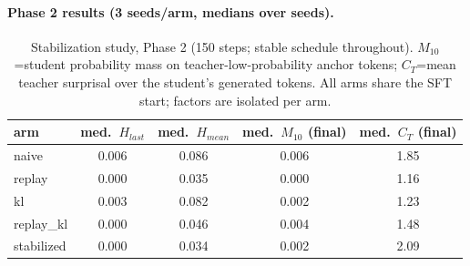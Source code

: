 \documentclass[11pt]{article}
\begin{document}
\paragraph{Phase 2 results (3 seeds/arm, medians over seeds).}
\begin{table}[h]
\centering
\caption{Stabilization study, Phase 2 (150 steps; stable schedule throughout). $M_{10}$=student probability mass on teacher-low-probability anchor tokens; $C_T$=mean teacher surprisal over the student's generated tokens. All arms share the SFT start; factors are isolated per arm.}
\label{tab:stab}
\small
\begin{tabular}{@{}lcccc@{}}
\toprule
\textbf{arm} & med.\ $H_{last}$ & med.\ $H_{mean}$ & med.\ $M_{10}$ (final) & med.\ $C_T$ (final) \\
\midrule
naive      & 0.006 & 0.086 & 0.006 & 1.85 \\
replay     & 0.000 & 0.035 & 0.000 & 1.16 \\
kl         & 0.003 & 0.082 & 0.002 & 1.23 \\
replay\_kl & 0.000 & 0.046 & 0.004 & 1.48 \\
stabilized & 0.000 & 0.034 & 0.002 & 2.09 \\
\bottomrule
\end{tabular}
\end{table}
\end{document}
